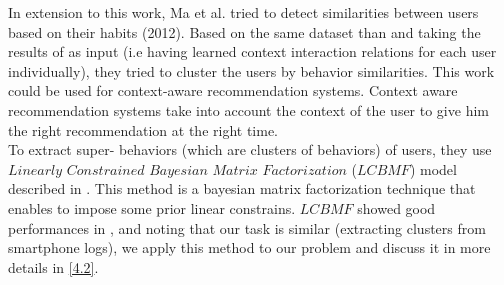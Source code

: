 In extension to this work, Ma et al. \cite{superbehaviors} tried to detect similarities between users based on their habits (2012). Based on the same dataset than \cite{interaction} and taking the results of \cite{interaction} as input (i.e having learned context interaction relations for each user individually), they tried to cluster the users by behavior similarities. This work could be used for context-aware recommendation systems. Context aware recommendation systems take into account the context of the user to give him the right recommendation at the right time.
\\To extract super- behaviors (which are clusters of behaviors) of users, they use $Linearly$ $Constrained$ $Bayesian$ $Matrix$ $Factorization$ ($LCBMF$) model described in \cite{superbehaviors}. This method is a bayesian matrix factorization technique that enables to impose some prior linear constrains. $LCBMF$ showed good performances in \cite{superbehaviors}, and noting that our task is similar (extracting clusters from smartphone logs), we apply this method to our problem and discuss it in more details in \ref{4.2}. 

